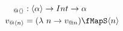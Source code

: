 \documentclass[preview]{standalone}
\begin{document}
\begin{align*}
  _{@\vect{}} &: \vect{\alpha} \rightarrow Int \rightarrow \alpha \\
  v_{@\vect{n}} & = (\lambda\ n \rightarrow v_{@n}) \fMapS \vect{n} 
\end{align*}
\end{document}
